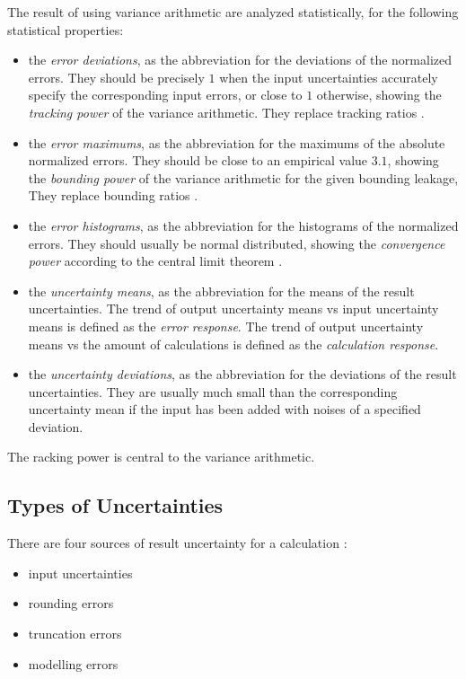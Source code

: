 \documentclass[twoside]{article}
\numberwithin{equation}{section}
\begin{document}
The result of using variance arithmetic are analyzed statistically, for the following statistical properties:
\begin{itemize}
\item the \emph{error deviations}, as the abbreviation for the deviations of the normalized errors. 
They should be precisely $1$ when the input uncertainties accurately specify the corresponding input errors, or close to $1$ otherwise, showing the \emph{tracking power} of the variance arithmetic.
They replace tracking ratios \cite{Prev_Precision_Arithmetic}.

\item the \emph{error maximums}, as the abbreviation for the maximums of the absolute normalized errors.  
They should be close to an empirical value $3.1$, showing the \emph{bounding power} of the variance arithmetic for the given bounding leakage, 
They replace bounding ratios \cite{Prev_Precision_Arithmetic}.

\item the \emph{error histograms}, as the abbreviation for the histograms of the normalized errors.  
They should usually be normal distributed, showing the \emph{convergence power} according to the central limit theorem \cite{Probability_Statistics}.

\item the \emph{uncertainty means}, as the abbreviation for the means of the result uncertainties.  
The trend of output uncertainty means vs input uncertainty means is defined as the \emph{error response}.
The trend of output uncertainty means vs the amount of calculations is defined as the \emph{calculation response}.

\item the \emph{uncertainty deviations}, as the abbreviation for the deviations of the result uncertainties.  
They are usually much small than the corresponding uncertainty mean if the input has been added with noises of a specified deviation.
\end{itemize}
The racking power is central to the variance arithmetic.




\subsection{Types of Uncertainties \cite{Prev_Precision_Arithmetic}}

There are four sources of result uncertainty for a calculation \cite{Statistical_Methods}\cite{Numerical_Recipes}:
\begin{itemize}
\item input uncertainties
\item rounding errors
\item truncation errors
\item modelling errors
\end{itemize}
\end{document}
